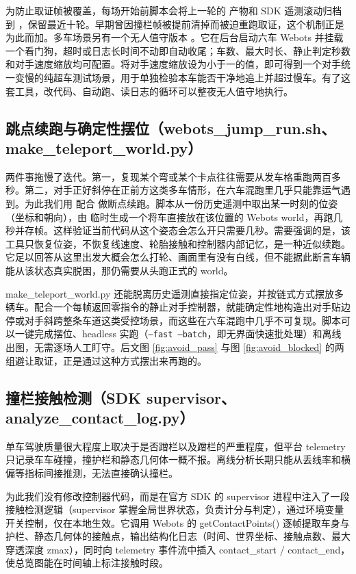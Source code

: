 \documentclass[UTF8,a4paper]{ctexart}
\begin{document}
为防止取证帧被覆盖，每场开始前脚本会将上一轮的  产物和 SDK 遥测滚动归档到 ，保留最近十轮。早期曾因撞栏帧被提前清掉而被迫重跑取证，这个机制正是为此而加。多车场景另有一个无人值守版本 。它在后台启动六车 Webots 并挂载一个看门狗，超时或日志长时间不动即自动收尾；车数、最大时长、静止判定秒数和对手速度缩放均可配置。将对手速度缩放设为小于一的值，即可得到一个对手统一变慢的纯超车测试场景，用于单独检验本车能否干净地追上并超过慢车。有了这套工具，改代码、自动跑、读日志的循环可以整夜无人值守地执行。

\subsection{跳点续跑与确定性摆位（webots\_jump\_run.sh、make\_teleport\_world.py）}

两件事拖慢了迭代。第一，复现某个弯或某个卡点往往需要从发车格重跑两百多秒。第二，对手正好斜停在正前方这类多车情形，在六车混跑里几乎只能靠运气遇到。为此我们用  配合  做断点续跑。脚本从一份历史遥测中取出某一时刻的位姿（坐标和朝向），由  临时生成一个将车直接放在该位置的 Webots world，再跑几秒并存帧。这样验证当前代码从这个姿态会怎么开只需要几秒。需要强调的是，该工具只恢复位姿，不恢复线速度、轮胎接触和控制器内部记忆，是一种近似续跑。它足以回答从这里出发大概会怎么打轮、画面里有没有白线，但不能据此断言车辆能从该状态真实脱困，那仍需要从头跑正式的 world。

make\_teleport\_world.py 还能脱离历史遥测直接指定位姿，并按链式方式摆放多辆车。配合一个每帧返回零指令的静止对手控制器，就能确定性地构造出对手贴边停或对手斜跨整条车道这类受控场景，而这些在六车混跑中几乎不可复现。脚本可以一键完成摆位、headless 实跑（\texttt{--fast --batch}，即无界面快速批处理）和离线出图，无需逐场人工盯守。后文图 \ref{fig:avoid_pass} 与图 \ref{fig:avoid_blocked} 的两组避让取证，正是通过这种方式摆出来再跑的。

\subsection{撞栏接触检测（SDK supervisor、analyze\_contact\_log.py）}

单车驾驶质量很大程度上取决于是否蹭栏以及蹭栏的严重程度，但平台 telemetry 只记录车车碰撞，撞护栏和静态几何体一概不报。离线分析长期只能从丢线率和横偏等指标间接推测，无法直接确认撞栏。

为此我们没有修改控制器代码，而是在官方 SDK 的 supervisor 进程中注入了一段接触检测逻辑（supervisor 掌握全局世界状态，负责计分与判定），通过环境变量开关控制，仅在本地生效。它调用 Webots 的 getContactPoints() 逐帧提取车身与护栏、静态几何体的接触点，输出结构化日志（时间、世界坐标、接触点数、最大穿透深度 zmax），同时向 telemetry 事件流中插入 contact\_start / contact\_end，使总览图能在时间轴上标注接触时段。
\end{document}
